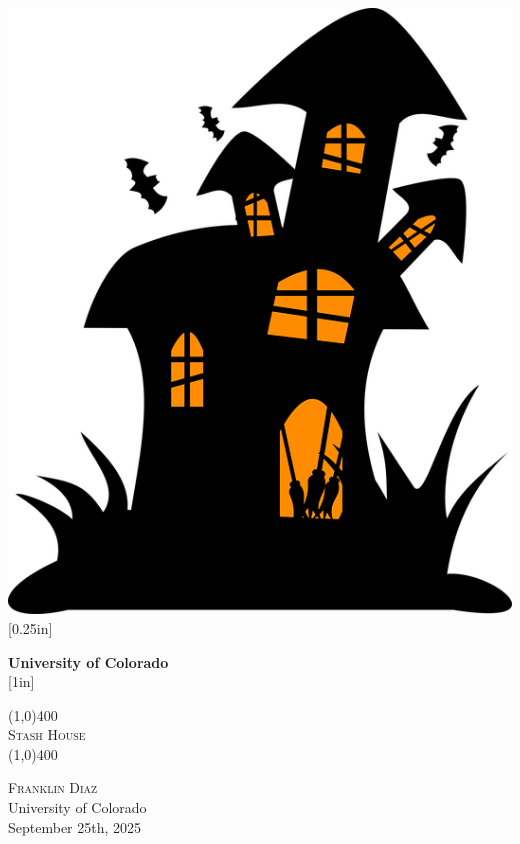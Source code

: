 \documentclass[11pt]{report}
\newcommand{\myTitle}{Stash House}
\newcommand{\myName}{Franklin Diaz}
\newcommand{\myOrg}{University of Colorado}
\newcommand{\myDate}{September 25th, 2025}
\begin{document}
	\begin{titlepage}
		\begin{center}
			\includegraphics[scale=0.20]{../static/images/new_logo.png}\\
			[0.25in]

			\textbf{\Large{\myOrg}}\\
			
			[1in]

			\line(1,0){400}\\
			[2mm]
			\textsc{\Large{\myTitle}} \\
			\line(1,0){400} \\
			[1in]
		\end{center}
		\begin{center}
			\textsc{\Large \myName}	\\
			\myOrg\\
			[1in]
			\myDate
		\end{center}
	\end{titlepage}

\end{document}
